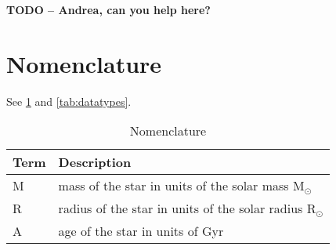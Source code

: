 \documentclass[a4paper, oneside, 11pt, article, english]{memoir}
\begin{document}
\textbf{TODO -- Andrea, can you help here?}


\section{Nomenclature}
\label{sec:nomenclature}


See \ref{tab:nomenclature} and \ref{tab:datatypes}.

\begin{table}[htbp]
  \centering
  \caption{Nomenclature}
  \label{tab:nomenclature}
  \begin{tabular}{@{}lp{9cm}@{}}
    \toprule
    Term                & Description                                                                                                                                                                                                                                                                                                                                                     \\
    \midrule
    M & mass of the star in units of the solar mass M$_\odot$ \\
    R & radius of the star in units of the solar radius R$_\odot$ \\
    A & age of the star in units of Gyr \\

\end{tabular}
\end{table}
\end{document}
